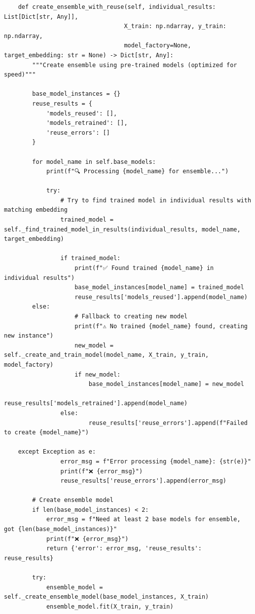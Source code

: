\begin{verbatim}
    def create_ensemble_with_reuse(self, individual_results: List[Dict[str, Any]], 
                                  X_train: np.ndarray, y_train: np.ndarray,
                                  model_factory=None, target_embedding: str = None) -> Dict[str, Any]:
        """Create ensemble using pre-trained models (optimized for speed)"""
        
        base_model_instances = {}
        reuse_results = {
            'models_reused': [],
            'models_retrained': [],
            'reuse_errors': []
        }
        
        for model_name in self.base_models:
            print(f"🔍 Processing {model_name} for ensemble...")
            
            try:
                # Try to find trained model in individual results with matching embedding
                trained_model = self._find_trained_model_in_results(individual_results, model_name, target_embedding)
                
                if trained_model:
                    print(f"✅ Found trained {model_name} in individual results")
                    base_model_instances[model_name] = trained_model
                    reuse_results['models_reused'].append(model_name)
        else:
                    # Fallback to creating new model
                    print(f"⚠️ No trained {model_name} found, creating new instance")
                    new_model = self._create_and_train_model(model_name, X_train, y_train, model_factory)
                    if new_model:
                        base_model_instances[model_name] = new_model
                        reuse_results['models_retrained'].append(model_name)
                else:
                        reuse_results['reuse_errors'].append(f"Failed to create {model_name}")
                        
    except Exception as e:
                error_msg = f"Error processing {model_name}: {str(e)}"
                print(f"❌ {error_msg}")
                reuse_results['reuse_errors'].append(error_msg)
        
        # Create ensemble model
        if len(base_model_instances) < 2:
            error_msg = f"Need at least 2 base models for ensemble, got {len(base_model_instances)}"
            print(f"❌ {error_msg}")
            return {'error': error_msg, 'reuse_results': reuse_results}
        
        try:
            ensemble_model = self._create_ensemble_model(base_model_instances, X_train)
            ensemble_model.fit(X_train, y_train)
            

\end{verbatim}
